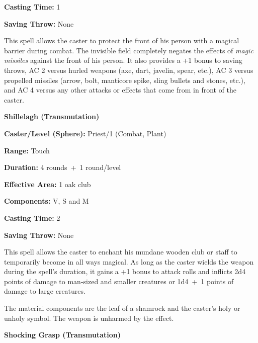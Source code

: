 \begin{multicols}{2}
\begin{minipage}{\columnwidth}
\noindent \textbf{Casting Time:} 1

\noindent \textbf{Saving Throw:} None

\end{minipage}

This spell allows the caster to protect the front of his person with a magical barrier during combat.  The invisible field completely negates the effects of \textit{magic missiles} against the front of his person.  It also provides a +1 bonus to saving throws, AC 2 versus hurled weapons (axe, dart, javelin, spear, etc.), AC 3 versus propelled missiles (arrow, bolt, manticore spike, sling bullets and stones, etc.), and AC 4 versus any other attacks or effects that come from in front of the caster.  

\vspace{1em}

\noindent
\begin{minipage}{\columnwidth}

\noindent \textbf{Shillelagh (Transmutation)}

\noindent \textbf{Caster/Level (Sphere):} Priest/1 (Combat, Plant)

\noindent \textbf{Range:} Touch

\noindent \textbf{Duration:} 4 rounds~+~1 round/level

\noindent \textbf{Effective Area:} 1 oak club

\noindent \textbf{Components:} V, S and M

\noindent \textbf{Casting Time:} 2

\noindent \textbf{Saving Throw:} None

\end{minipage}

This spell allows the caster to enchant his mundane wooden club or staff to temporarily become in all ways magical.  As long as the caster wields the weapon during the spell's duration, it gains a +1 bonus to attack rolls and inflicts 2d4 points of damage to man-sized and smaller creatures or 1d4~+~1 points of damage to large creatures.

The material components are the leaf of a shamrock and the caster's holy or unholy symbol.  The weapon is unharmed by the effect.

\vspace{1em}

\noindent
\begin{minipage}{\columnwidth}

\noindent \textbf{Shocking Grasp (Transmutation)}


\end{minipage}
\end{multicols}
